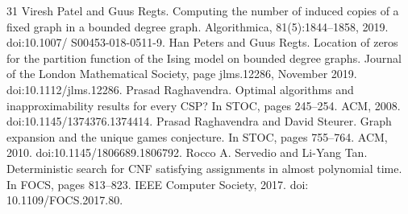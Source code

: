 \begin{thebibliography}{31}
Viresh Patel and Guus Regts. Computing the number of induced copies of a fixed graph in a bounded degree graph. Algorithmica, 81(5):1844–1858, 2019. doi:10.1007/ S00453-018-0511-9.
Han Peters and Guus Regts. Location of zeros for the partition function of the Ising model on bounded degree graphs. Journal of the London Mathematical Society, page jlms.12286, November 2019. doi:10.1112/jlms.12286.
Prasad Raghavendra. Optimal algorithms and inapproximability results for every CSP? In STOC, pages 245–254. ACM, 2008. doi:10.1145/1374376.1374414.
Prasad Raghavendra and David Steurer. Graph expansion and the unique games conjecture. In STOC, pages 755–764. ACM, 2010. doi:10.1145/1806689.1806792.
Rocco A. Servedio and Li-Yang Tan. Deterministic search for CNF satisfying assignments in almost polynomial time. In FOCS, pages 813–823. IEEE Computer Society, 2017. doi: 10.1109/FOCS.2017.80.
\end{thebibliography}
